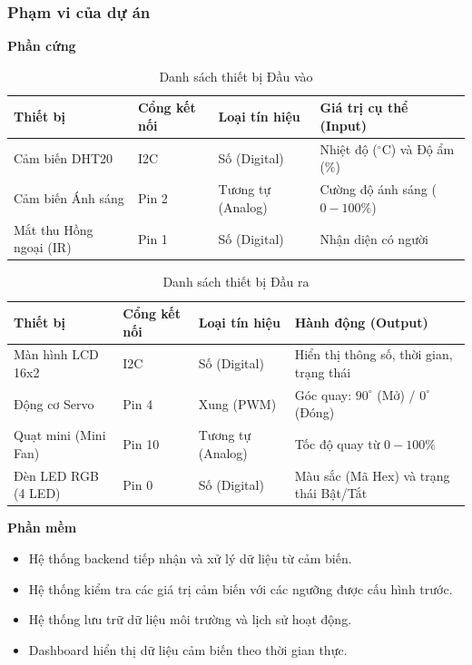 \documentclass[a4paper,twoside]{article}
\begin{document}
\subsubsection{Phạm vi của dự án}

\textbf{Phần cứng}

\begin{table}[htbp]
\centering
\caption{Danh sách thiết bị Đầu vào}
\label{tab:inputs}
\begin{tabular}{|l|l|l|l|}
\hline
\textbf{Thiết bị} & \textbf{Cổng kết nối} & \textbf{Loại tín hiệu} & \textbf{Giá trị cụ thể (Input)} \\ \hline
Cảm biến DHT20 & I2C & Số (Digital) & Nhiệt độ ($^\circ$C) và Độ ẩm (\%) \\ \hline
Cảm biến Ánh sáng & Pin 2 & Tương tự (Analog) & Cường độ ánh sáng ($0 - 100\%$) \\ \hline
Mắt thu Hồng ngoại (IR) & Pin 1 & Số (Digital) & Nhận diện có người \\ \hline
\end{tabular}
\end{table}


\begin{table}[htbp]
\centering
\caption{Danh sách thiết bị Đầu ra }
\label{tab:outputs}
\begin{tabular}{|l|l|l|l|}
\hline
\textbf{Thiết bị} & \textbf{Cổng kết nối} & \textbf{Loại tín hiệu} & \textbf{Hành động (Output)} \\ \hline
Màn hình LCD 16x2 & I2C & Số (Digital) & Hiển thị thông số, thời gian, trạng thái \\ \hline
Động cơ Servo & Pin 4 & Xung (PWM) & Góc quay: $90^\circ$ (Mở) / $0^\circ$ (Đóng) \\ \hline
Quạt mini (Mini Fan) & Pin 10 & Tương tự (Analog) & Tốc độ quay từ $0 - 100\%$ \\ \hline
Đèn LED RGB (4 LED) & Pin 0 & Số (Digital) & Màu sắc (Mã Hex) và trạng thái Bật/Tắt \\ \hline
\end{tabular}
\end{table}


\textbf{Phần mềm}

\begin{itemize}

\item Hệ thống backend tiếp nhận và xử lý dữ liệu từ cảm biến.

\item Hệ thống kiểm tra các giá trị cảm biến với các ngưỡng
được cấu hình trước.

\item Hệ thống lưu trữ dữ liệu môi trường và lịch sử hoạt động.

\item Dashboard hiển thị dữ liệu cảm biến theo thời gian thực.

\end{itemize}
\end{document}
